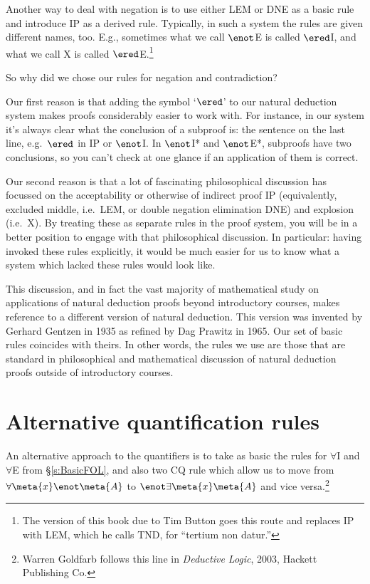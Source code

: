 Another way to deal with negation is to use either LEM or DNE as a basic rule and introduce IP as a derived rule. Typically, in such a system the rules are given different names, too. E.g., sometimes what we call $\enot$E is called $\ered$I, and what we call X is called $\ered$E.\footnote{The version of this book due to Tim Button goes this route and replaces IP with LEM, which he calls TND, for ``tertium non datur.''}

So why did we chose our rules for negation and contradiction? 

Our first reason is that adding the symbol `$\ered$' to our natural deduction system makes proofs considerably easier to work with. For instance, in our system it's always clear what the conclusion of a subproof is: the sentence on the last line, e.g.\ $\ered$ in IP or $\enot$I. In $\enot$I* and $\enot$E*, subproofs have two conclusions, so you can't check at one glance if an application of them is correct. 

Our second reason is that a lot of fascinating philosophical discussion has focussed on the acceptability or otherwise of indirect proof IP (equivalently, excluded middle, i.e.\ LEM, or double negation elimination DNE) and explosion (i.e.\ X). By treating these as separate rules in the proof system, you will be  in a better position to engage with that philosophical discussion. In particular: having invoked these rules explicitly, it would be much easier for us to know what a system which lacked these rules would look like.

This discussion, and in fact the vast majority of mathematical study on applications of natural deduction proofs beyond introductory courses, makes reference to a different version of natural deduction. This version was invented by Gerhard Gentzen in 1935 as refined by Dag Prawitz in 1965. Our set of basic rules coincides with theirs. In other words, the rules we use are those that are standard in philosophical and mathematical discussion of natural deduction proofs outside of introductory courses.



\section{Alternative quantification rules}
An alternative approach to the quantifiers is to take as basic the rules for $\forall$I and $\forall$E from \S\ref{s:BasicFOL}, and also two CQ rule which allow us to move from $\forall \meta{x} \enot \meta{A}$ to $\enot \exists \meta{x} \meta{A}$ and vice versa.\footnote{Warren Goldfarb follows this line in \emph{Deductive Logic}, 2003, Hackett Publishing Co.}  

